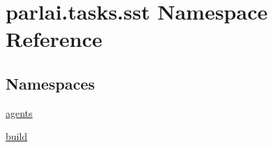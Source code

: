 \hypertarget{namespaceparlai_1_1tasks_1_1sst}{}\section{parlai.\+tasks.\+sst Namespace Reference}
\label{namespaceparlai_1_1tasks_1_1sst}
\subsection*{Namespaces}
\begin{DoxyCompactItemize}
\item 
 \hyperlink{namespaceparlai_1_1tasks_1_1sst_1_1agents}{agents}
\item 
 \hyperlink{namespaceparlai_1_1tasks_1_1sst_1_1build}{build}
\end{DoxyCompactItemize}
